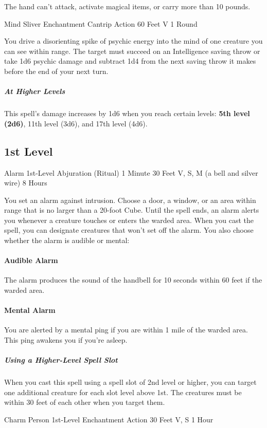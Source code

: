 \documentclass[letterpaper,openany,oneside,twocolumn]{book}
\begin{document}
The hand can't attack, activate magical items, or carry more than 10 pounds.

\DndSpellHeader
  {Mind Sliver}
  {Enchantment Cantrip}
  {Action}
  {60 Feet}
  {V}
  {1 Round}

You drive a disorienting spike of psychic energy into the mind of one creature you can see within range. The target must succeed on an Intelligence saving throw or take 1d6 psychic damage and subtract 1d4 from the next saving throw it makes before the end of your next turn.

\subparagraph*{At Higher Levels} This spell's damage increases by 1d6 when you reach certain levels: \textbf{5th level (2d6)}, 11th level (3d6), and 17th level (4d6).

\subsection*{1st Level}

\DndSpellHeader
  {Alarm}
  {1st-Level Abjuration (Ritual)}
  {1 Minute}
  {30 Feet}
  {V, S, M (a bell and silver wire)}
  {8 Hours}

You set an alarm against intrusion. Choose a door, a window, or an area within range that is no larger than a 20-foot Cube. Until the spell ends, an alarm alerts you whenever a creature touches or enters the warded area. When you cast the spell, you can designate creatures that won't set off the alarm. You also choose whether the alarm is audible or mental:
\paragraph*{Audible Alarm} The alarm produces the sound of the handbell for 10 seconds within 60 feet if the warded area.
\paragraph*{Mental Alarm} You are alerted by a mental ping if you are within 1 mile of the warded area. This ping awakens you if you're asleep.

\subparagraph*{Using a Higher-Level Spell Slot} When you cast this spell using a spell slot of 2nd level or higher, you can target one additional creature for each slot level above 1st. The creatures must be within 30 feet of each other when you target them.

\DndSpellHeader
  {Charm Person}
  {1st-Level Enchantment}
  {Action}
  {30 Feet}
  {V, S}
  {1 Hour}
\end{document}
